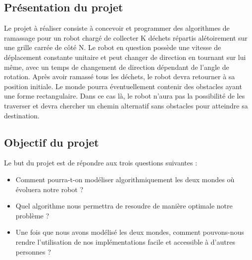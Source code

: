 \documentclass{report}
\begin{document}
\subsection{\Large Présentation du projet}
\hspace{0,5cm} \Large Le projet \`a  r\'ealiser consiste \`a concevoir et programmer des algorithmes de ramassage pour un robot charg\'e de collecter K d\'echets r\'epartis al\'etoirement
sur une grille carr\'ee de c\^ot\'e N. Le robot en question poss\`ede une vitesse de d\'eplacement constante unitaire et peut changer de direction en tournant sur lui m\^eme, avec un temps de changement
de direction d\'ependant de l'angle de rotation. Apr\`es avoir ramass\'e tous les d\'echets, le robot devra retourner \`a sa position initiale.
Le monde pourra \'eventuellement contenir des obstacles ayant une forme rectangulaire. Dans ce cas l\`a, le robot n'aura pas la possibilit\'    e de les traverser et devra chercher un chemin alternatif
sans obstacles pour atteindre sa destination.

\subsection{\Large Objectif du projet}
\hspace{0,5cm} \Large Le but du projet est de r\'epondre aux trois questions suivantes : \\
\hspace{1 cm} 
\begin{itemize}
\item Comment pourra-t-on mod\'eliser algorithmiquement les deux mondes o\`u \'evoluera notre robot ?
\item Quel algorithme nous permettra de resoudre de mani\`ere optimale notre probl\`eme ?
\item Une fois que nous avons mod\'elis\'e les deux mondes, comment pouvons-nous rendre l'utilisation de nos impl\'ementations facile et accessible à d'autres personnes ?
\end{itemize}

\newpage
\end{document}

